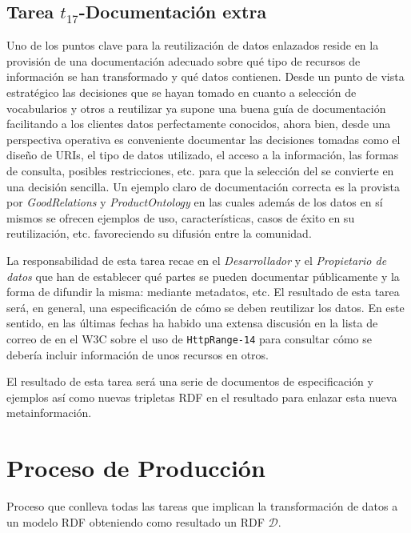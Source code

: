 \subsection{Tarea $t_{17}$-Documentación extra}\label{t17-metodos}
Uno de los puntos clave para la reutilización de datos enlazados reside 
en la provisión de una documentación adecuado sobre qué tipo de recursos 
de información se han transformado y qué datos contienen. Desde un punto 
de vista estratégico las decisiones que se hayan tomado en cuanto a 
selección de vocabularios y otros \datasets a reutilizar ya supone 
una buena guía de documentación facilitando a los clientes datos 
perfectamente conocidos, ahora bien, desde una perspectiva 
operativa es conveniente documentar las decisiones tomadas como el diseño 
de URIs, el tipo de datos utilizado, el acceso a la información, las formas 
de consulta, posibles restricciones, etc. para que la selección del \dataset 
se convierte en una decisión sencilla. Un ejemplo claro de documentación correcta 
es la provista por \textit{GoodRelations} y \textit{ProductOntology} en las cuales 
además de los datos en sí mismos se ofrecen ejemplos de uso, características, casos 
de éxito en su reutilización, etc. favoreciendo su difusión entre la comunidad.

La responsabilidad de esta tarea recae en el \textit{Desarrollador} y el \textit{Propietario de datos} que han de establecer 
qué partes se pueden documentar públicamente y la forma de difundir la misma: mediante metadatos, etc. El resultado 
de esta tarea será, en general, una especificación de cómo se deben reutilizar los datos. En este sentido, en las últimas 
fechas ha habido una extensa discusión en la lista de correo de \lod en el \gls{W3C} sobre el uso de \texttt{HttpRange-14} para 
consultar cómo se debería incluir información de unos recursos en otros.

El resultado de esta tarea será una serie de documentos de especificación y ejemplos así como nuevas tripletas \gls{RDF} 
en el \dataset resultado para enlazar esta nueva metainformación.

\section{Proceso de Producción}\label{sect:produccion}

\begin{definition}[Producción]
Proceso que conlleva todas las tareas que implican la transformación de datos a un modelo RDF obteniendo 
como resultado un \dataset \gls{RDF} $\mathcal{D}$.
\end{definition}

